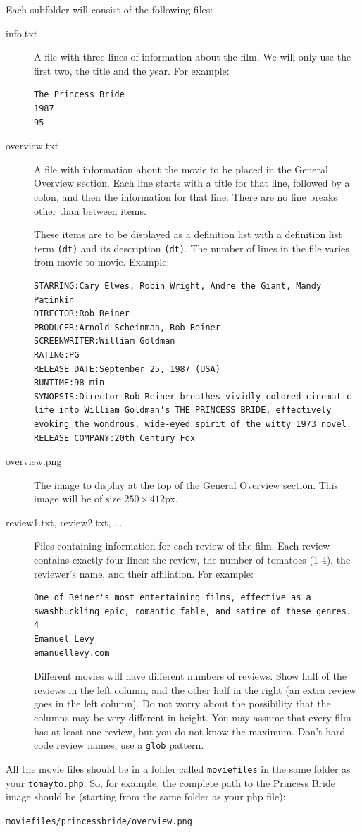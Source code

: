 \documentclass{article}
\begin{document}
Each subfolder will consist of the following files:
\begin{description}
\item[info.txt] A file with three lines of information about the
  film. We will only use the first two, the title and the year.  For
  example: 
\begin{Verbatim}[frame=single]
The Princess Bride
1987
95
\end{Verbatim}
\item[overview.txt] A file with information about the movie to be
  placed in the General Overview section.  Each line starts with a
  title for that line, followed by a colon, and then the information
  for that line.  There are no line breaks other than between items.

  These items are to  be displayed as a definition list with a
  definition list term \verb|(dt)| and its description \verb|(dt)|.
  The number of lines in the file varies from movie to movie.  Example:
\begin{Verbatim}[frame=single]
STARRING:Cary Elwes, Robin Wright, Andre the Giant, Mandy Patinkin
DIRECTOR:Rob Reiner
PRODUCER:Arnold Scheinman, Rob Reiner
SCREENWRITER:William Goldman
RATING:PG
RELEASE DATE:September 25, 1987 (USA)
RUNTIME:98 min
SYNOPSIS:Director Rob Reiner breathes vividly colored cinematic life into William Goldman's THE PRINCESS BRIDE, effectively evoking the wondrous, wide-eyed spirit of the witty 1973 novel.
RELEASE COMPANY:20th Century Fox
\end{Verbatim}

\item[overview.png] The image to display at the top of the General
  Overview section.  This image will be of size
$250\times412$px. 
\item[review1.txt, review2.txt, ...]  Files containing information for
  each review of the film.  Each review contains exactly four lines:
  the review, the number of tomatoes (1-4), the reviewer's name, and
  their affiliation.  For example:
  \begin{Verbatim}[frame=single]
One of Reiner's most entertaining films, effective as a swashbuckling epic, romantic fable, and satire of these genres.
4
Emanuel Levy
emanuellevy.com
  \end{Verbatim}
  Different movies will have different numbers of reviews.  Show half
  of the reviews in the left column, and the other half in the right
  (an extra review goes in the left column).  Do not worry about the
  possibility that the columns may be very different in height.  You
  may assume that every film has at least one review, but you do not
  know the maximum.  Don't hard-code review names, use a {\tt glob}
  pattern. 

\end{description}
All the movie files should be in a folder called {\tt moviefiles} in
the same folder as your {\tt tomayto.php}.  So, for example, the
complete path to the Princess Bride image should be (starting from the
same folder as your php file):\\
\centerline{\tt moviefiles/princessbride/overview.png}
\end{document}
